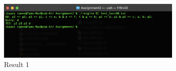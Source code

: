 \documentclass{assignment}
\begin{document}
                                                                                                                                                                                                                                                                                                                                                                                                                                                                                                                                                                                                                                                                                                                                                                                                                                                                                                                                                                                                                                                                                                                                                                                                                                                                                                                                                                                                                                                                                                                                                                                                                                                                                                                                                                                                                                                                                                                                                                                                                                                                                                                                                                                                                                                                                                                                                                                                                                                                                                                                                            \begin{figure}[h]
    \centering
    \includegraphics[width=0.8\textwidth]{./assets/test_HornKB_BC.png}
    \caption{Result 1}
    \label{fig:fig8}
\end{figure}
\end{document}
